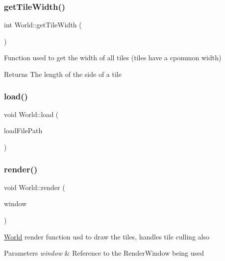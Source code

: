 \subsubsection{\texorpdfstring{getTileWidth()}{getTileWidth()}}
{\footnotesize\ttfamily int World\+::get\+Tile\+Width (\begin{DoxyParamCaption}{ }\end{DoxyParamCaption})}



Function used to get the width of all tiles (tiles have a cpommon width) 

\begin{DoxyReturn}{Returns}
The length of the side of a tile
\end{DoxyReturn}
\mbox{\label{class_world_a1c49801c5b871dae1a2713cd146c703a}} 
\subsubsection{\texorpdfstring{load()}{load()}}
{\footnotesize\ttfamily void World\+::load (\begin{DoxyParamCaption}\item[{std\+::string}]{load\+File\+Path }\end{DoxyParamCaption})}

\mbox{\label{class_world_a6be69ff54f7f29713c0954cabe34aecc}} 
\subsubsection{\texorpdfstring{render()}{render()}}
{\footnotesize\ttfamily void World\+::render (\begin{DoxyParamCaption}\item[{sf\+::\+Render\+Window \&}]{window }\end{DoxyParamCaption})}



\mbox{\hyperlink{class_world}{World}} render function usd to draw the tiles, handles tile culling also 


\begin{DoxyParams}{Parameters}
{\em window} & Reference to the Render\+Window being used\\
\hline
\end{DoxyParams}
\mbox{\label{class_world_aef1be6281463d26f71eec97cb233060d}} 
